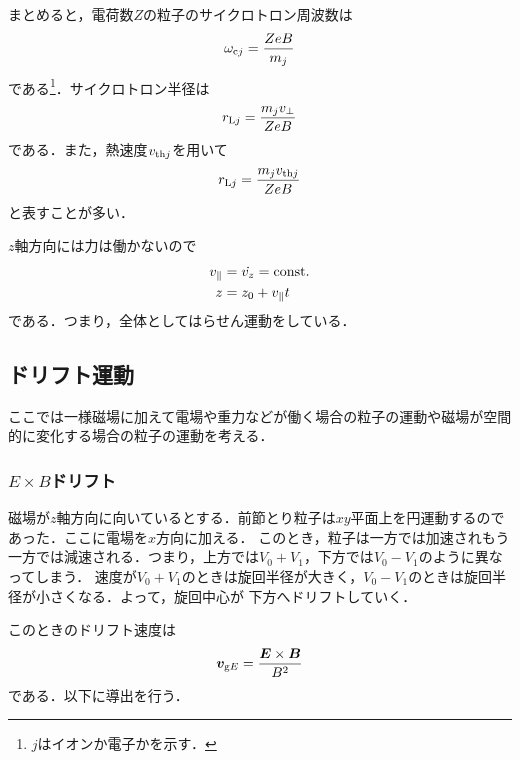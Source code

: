 \documentclass{report}
\begin{document}
      まとめると，電荷数$Z$の粒子のサイクロトロン周波数は
      \begin{align}
        \omega_{\mathrm{c}j} = \frac{Z e B}{m_j}
      \end{align}
      である\footnote{$j$はイオンか電子かを示す．}．サイクロトロン半径は
      \begin{align}
        r_{\mathrm{L}j} = \frac{m_j v_{\perp}}{ZeB}
      \end{align}
      である．また，熱速度$v_{{\mathrm{th}}j}$を用いて
      \begin{align}
        r_{\mathrm{L}j} = \frac{m_j v_{{\mathrm{th}}j}}{ZeB}
      \end{align}
      と表すことが多い．

      $z$軸方向には力は働かないので
      \begin{align}
        v_{\parallel} &= \dot{v_z} = \mathrm{const.}\\
        z &= z_0 + v_{\parallel}t
      \end{align}
      である．つまり，全体としてはらせん運動をしている．

    \subsection{ドリフト運動}
      
      ここでは一様磁場に加えて電場や重力などが働く場合の粒子の運動や磁場が空間的に変化する場合の粒子の運動を考える．

      \subsubsection{$E\times B$ドリフト}
        磁場が$z$軸方向に向いているとする．前節とり粒子は$xy$平面上を円運動するのであった．ここに電場を$x$方向に加える．
        このとき，粒子は一方では加速されもう一方では減速される．つまり，上方では$V_0+V_1$，下方では$V_0-V_1$のように異なってしまう．
        速度が$V_0+V_1$のときは旋回半径が大きく，$V_0-V_1$のときは旋回半径が小さくなる．よって，旋回中心が
        下方へドリフトしていく．

        このときのドリフト速度は
        \begin{align}
          \bm{v}_{\mathrm{g}E} = \frac{\bm{E}\times\bm{B}}{B^2} 
        \end{align}
        である．以下に導出を行う．
        
\end{document}

